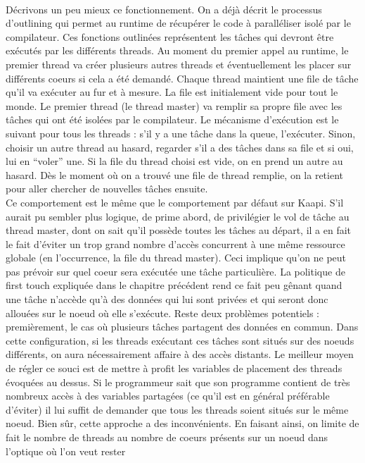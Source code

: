 \documentclass{report}
\begin{document}
\\Décrivons un peu mieux ce fonctionnement. On a déjà décrit le processus d'outlining qui permet au
runtime de récupérer le code à paralléliser isolé par le compilateur. Ces fonctions outlinées 
représentent les tâches qui devront être exécutés par les différents threads. Au moment du premier
appel au runtime, le premier thread va créer plusieurs autres threads et éventuellement les placer
sur différents coeurs si cela a été demandé. Chaque thread maintient une file de tâche qu'il va
exécuter au fur et à mesure. La file est initialement vide pour tout le monde. Le premier thread
(le thread master) va remplir sa propre file avec les tâches qui ont été isolées par le compilateur.
Le mécanisme d'exécution est le suivant pour tous les threads : s'il y a une tâche dans la queue,
l'exécuter. Sinon, choisir un autre thread au hasard, regarder s'il a des tâches dans sa file et si
oui, lui en ``voler'' une. Si la file du thread choisi est vide, on en prend un autre au hasard. 
Dès le moment où on a trouvé une file de thread remplie, on la retient pour aller chercher de 
nouvelles tâches ensuite. 
\\Ce comportement est le même que le comportement par défaut sur Kaapi. S'il aurait pu sembler
plus logique, de prime abord, de privilégier le vol de tâche au thread master, dont on sait
qu'il possède toutes les tâches au départ, il a en fait le fait d'éviter un trop grand 
nombre d'accès concurrent à une même ressource globale (en l'occurrence, la file du thread
master). Ceci implique qu'on ne peut pas prévoir sur quel coeur sera exécutée une tâche 
particulière. La politique de first touch expliquée dans le chapitre précédent rend ce 
fait peu gênant quand une tâche n'accède qu'à des données qui lui sont privées et qui seront
donc allouées sur le noeud où elle s'exécute. Reste deux problèmes potentiels : premièrement,
le cas où plusieurs tâches partagent des données en commun. Dans cette configuration, si les
threads exécutant ces tâches sont situés sur des noeuds différents, on aura nécessairement
affaire à des accès distants. Le meilleur moyen de régler ce souci est de mettre à profit
les variables de placement des threads évoquées au dessus. Si le programmeur sait que son
programme contient de très nombreux accès à des variables partagées (ce qu'il est en général
préférable d'éviter) il lui suffit de demander que tous les threads soient situés sur le même
noeud. Bien sûr, cette approche a des inconvénients. En faisant ainsi, on limite de fait le
nombre de threads au nombre de coeurs présents sur un noeud dans l'optique où l'on veut rester
\end{document}
